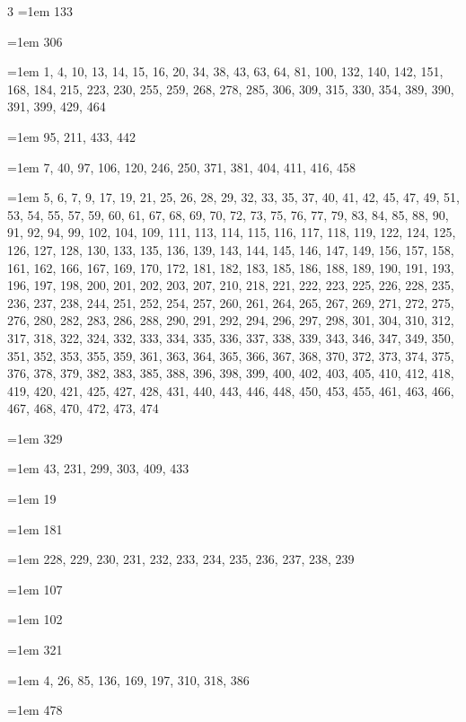 \begin{multicols}{3}
\hangindent=1em  133\par
\hangindent=1em  306\par
\hangindent=1em  1, 4, 10, 13, 14, 15, 16, 20, 34, 38, 43, 63, 64, 81, 100, 132, 140, 142, 151, 168, 184, 215, 223, 230, 255, 259, 268, 278, 285, 306, 309, 315, 330, 354, 389, 390, 391, 399, 429, 464\par
\hangindent=1em  95, 211, 433, 442\par
\hangindent=1em  7, 40, 97, 106, 120, 246, 250, 371, 381, 404, 411, 416, 458\par
\hangindent=1em  5, 6, 7, 9, 17, 19, 21, 25, 26, 28, 29, 32, 33, 35, 37, 40, 41, 42, 45, 47, 49, 51, 53, 54, 55, 57, 59, 60, 61, 67, 68, 69, 70, 72, 73, 75, 76, 77, 79, 83, 84, 85, 88, 90, 91, 92, 94, 99, 102, 104, 109, 111, 113, 114, 115, 116, 117, 118, 119, 122, 124, 125, 126, 127, 128, 130, 133, 135, 136, 139, 143, 144, 145, 146, 147, 149, 156, 157, 158, 161, 162, 166, 167, 169, 170, 172, 181, 182, 183, 185, 186, 188, 189, 190, 191, 193, 196, 197, 198, 200, 201, 202, 203, 207, 210, 218, 221, 222, 223, 225, 226, 228, 235, 236, 237, 238, 244, 251, 252, 254, 257, 260, 261, 264, 265, 267, 269, 271, 272, 275, 276, 280, 282, 283, 286, 288, 290, 291, 292, 294, 296, 297, 298, 301, 304, 310, 312, 317, 318, 322, 324, 332, 333, 334, 335, 336, 337, 338, 339, 343, 346, 347, 349, 350, 351, 352, 353, 355, 359, 361, 363, 364, 365, 366, 367, 368, 370, 372, 373, 374, 375, 376, 378, 379, 382, 383, 385, 388, 396, 398, 399, 400, 402, 403, 405, 410, 412, 418, 419, 420, 421, 425, 427, 428, 431, 440, 443, 446, 448, 450, 453, 455, 461, 463, 466, 467, 468, 470, 472, 473, 474\par
\hangindent=1em  329\par
\hangindent=1em  43, 231, 299, 303, 409, 433\par
\hangindent=1em  19\par
\hangindent=1em  181\par
\hangindent=1em  228, 229, 230, 231, 232, 233, 234, 235, 236, 237, 238, 239\par
\hangindent=1em  107\par
\hangindent=1em  102\par
\hangindent=1em  321\par
\hangindent=1em  4, 26, 85, 136, 169, 197, 310, 318, 386\par
\hangindent=1em  478\par

\end{multicols}
